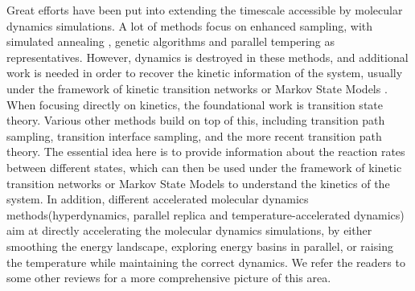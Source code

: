 \documentclass[english, aip, jcp, priprint, graphicx,floatfix]{revtex4-1}
\theoremstyle{plain}
\theoremstyle{definition}
\theoremstyle{plain}
\begin{document}
Great efforts have been put into extending the timescale accessible by molecular dynamics simulations. A lot of methods focus on enhanced sampling, with simulated annealing \cite{Kirkpatrick1983-su}, genetic algorithms\cite{Goldberg1989-ko} and parallel tempering\cite{Sugita1999-vh} as representatives. However, dynamics is destroyed in these methods, and additional work\cite{Yang2007-gn, Andrec2005-fh, Zheng2009-ow, Huang2010-uu} is needed in order to recover the kinetic information of the system, usually under the framework of kinetic transition networks\cite{Noe2006-cs, Wales2006-ur} or Markov State Models \cite{Pande2010-yi, Chodera2014-bh, Husic2018-xp}. When focusing directly on kinetics, the foundational work is transition state theory\cite{Eyring1935-ur, Chandler1978-bq, Wigner1997-kk}. Various other methods build on top of this, including  transition path sampling\cite{Dellago1998-lb, Bolhuis2002-ws}, transition interface sampling\cite{Van_Erp2005-vw}, and the more recent transition path theory\cite{E2006-fm, E2010-sr}. The essential idea here is to provide information about the reaction rates between different states, which can then be used under the framework of kinetic transition networks\cite{Noe2006-cs, Wales2006-ur} or Markov State Models \cite{Pande2010-yi, Chodera2014-bh, Husic2018-xp} to understand the kinetics of the system. In addition, different accelerated molecular dynamics methods\cite{Perez2009-jy}(hyperdynamics\cite{Voter1997-gi}, parallel replica\cite{Voter1998-mv} and temperature-accelerated dynamics\cite{Sorensen2000-qm}) aim at directly accelerating the molecular dynamics simulations, by either smoothing the energy landscape, exploring energy basins in parallel, or raising the temperature while maintaining the correct dynamics. We refer the readers to some other reviews\cite{Klenin2011-jf, Christen2008-ge, Perez2009-jy} for a more comprehensive picture of this area.
\end{document}
